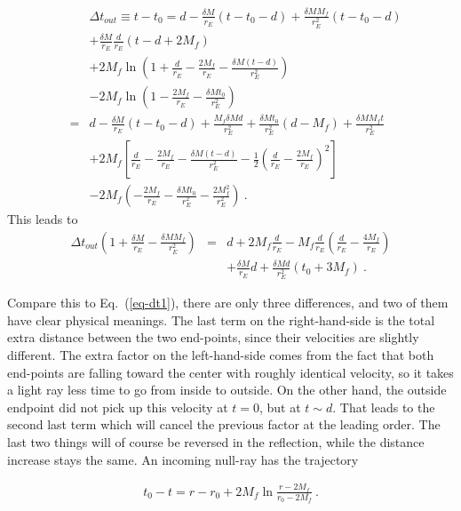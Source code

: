 \documentclass[aps,showpacs,twocolumn,floats,prd,superscriptaddress,nofootinbib]{revtex4-1}
\begin{document}
\begin{eqnarray}
& & \Delta t_{out} \equiv  t - t_0 = d - \frac{\delta M}{r_E}(t - t_0 - d) + \frac{\delta M M_f}{r_E^2} (t - t_0 -d)	\nonumber	\\
&  & + \frac{\delta M}{r_E}\frac{d}{r_E}(t-d+2M_f) \label{eq-SolveCross} \nonumber	\\
& & + 2M_f\ln\left(1+\frac{d}{r_E}-\frac{2M_f}{r_E} -\frac{\delta M(t-d)}{r_E^2} \right) 
\nonumber \\ \nonumber
& & - 2M_f\ln\left(1-\frac{2M_f}{r_E} -\frac{\delta Mt_0}{r_E^2} \right)
\\ \nonumber
&=& d - \frac{\delta M}{r_E}(t - t_0 - d) + \frac{M_f \delta M d}{r_E^2} + \frac{\delta M t_0}{r_E^2}(d-M_f) + \frac{\delta M M_f t}{r_E^2} \\ \nonumber
& & + 2M_f \left[ \frac{d}{r_E}-\frac{2M_f}{r_E} -\frac{\delta M(t-d)}{r_E^2}  - \frac{1}{2} \left( \frac{d}{r_E}-\frac{2M_f}{r_E} \right)^2 \right] \\ \nonumber
& & - 2M_f \left( -\frac{2M_f}{r_E} -\frac{\delta Mt_0}{r_E^2} - \frac{2M_f^2}{r_E^2} \right)~.
\end{eqnarray}
This leads to
\begin{eqnarray}
\Delta t_{out} \left(1 + \frac{\delta M}{r_E} - \frac{\delta M M_f}{r_E^2}\right) &=& 
d + 2M_f\frac{d}{r_E} - M_f\frac{d}{r_E}
\left( \frac{d}{r_E}-\frac{4M_f}{r_E} \right) \nonumber \\ 
& & + \frac{\delta M}{r_E}d + \frac{\delta Md}{r_E^2} (t_0+3M_f)~.
\end{eqnarray}

Compare this to Eq.~(\ref{eq-dt1}), there are only three differences, and two of them have clear physical meanings. The last term on the right-hand-side is the total extra distance between the two end-points, since their velocities are slightly different. The extra factor on the left-hand-side comes from the fact that both end-points are falling toward the center with roughly identical velocity, so it takes a light ray less time to go from inside to outside. On the other hand, the outside endpoint did not pick up this velocity at $t=0$, but at $t\sim d$. That leads to the second last term which will cancel the previous factor at the leading order. The last two things will of course be reversed in the reflection, while the distance increase stays the same. An incoming null-ray has the trajectory

\begin{eqnarray}
t_0 - t = r-r_0 + 2M_f\ln\frac{r-2M_f}{r_0-2M_f}~.
\end{eqnarray}
\end{document}
